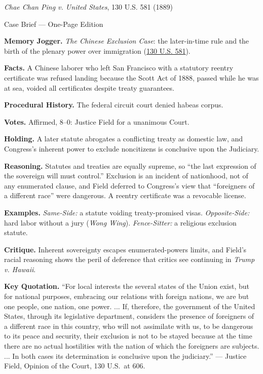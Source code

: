 \documentclass[12pt]{article}
\begin{document}
\begin{center}
{\Large \textit{Chae Chan Ping v. United States}, 130 U.S. 581 (1889)\par}
\vspace{0.3em}
{\normalsize Case Brief --- One-Page Edition\par}
\end{center}

\textbf{Memory Jogger.} \textit{The Chinese Exclusion Case}: the later-in-time rule and the birth of the plenary power over immigration (\href{https://supreme.justia.com/cases/federal/us/130/581/}{130 U.S. 581}).

\textbf{Facts.} A Chinese laborer who left San Francisco with a statutory reentry certificate was refused landing because the Scott Act of 1888, passed while he was at sea, voided all certificates despite treaty guarantees.

\textbf{Procedural History.} The federal circuit court denied habeas corpus.

\textbf{Votes.} Affirmed, 8--0: Justice Field for a unanimous Court.

\textbf{Holding.} A later statute abrogates a conflicting treaty as domestic law, and Congress's inherent power to exclude noncitizens is conclusive upon the Judiciary.

\textbf{Reasoning.} Statutes and treaties are equally supreme, so ``the last expression of the sovereign will must control.'' Exclusion is an incident of nationhood, not of any enumerated clause, and Field deferred to Congress's view that ``foreigners of a different race'' were dangerous. A reentry certificate was a revocable license.

\textbf{Examples.} \emph{Same-Side:} a statute voiding treaty-promised visas. \emph{Opposite-Side:} hard labor without a jury (\textit{Wong Wing}). \emph{Fence-Sitter:} a religious exclusion statute.

\textbf{Critique.} Inherent sovereignty escapes enumerated-powers limits, and Field's racial reasoning shows the peril of deference that critics see continuing in \textit{Trump v. Hawaii}.

\textbf{Key Quotation.} ``For local interests the several states of the Union exist, but for national purposes, embracing our relations with foreign nations, we are but one people, one nation, one power. ... If, therefore, the government of the United States, through its legislative department, considers the presence of foreigners of a different race in this country, who will not assimilate with us, to be dangerous to its peace and security, their exclusion is not to be stayed because at the time there are no actual hostilities with the nation of which the foreigners are subjects. ... In both cases its determination is conclusive upon the judiciary.'' --- Justice Field, Opinion of the Court, 130 U.S.\ at 606.
\end{document}
